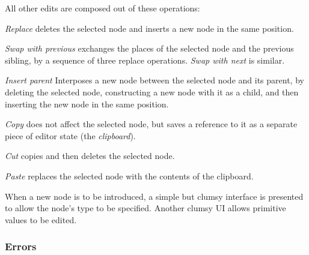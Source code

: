 All other edits are composed out of these operations:

\emph{Replace} deletes the selected node and inserts a new node in the same position.

\emph{Swap with previous} exchanges the places of the selected node and the previous sibling, by a sequence of three replace operations. \emph{Swap with next} is similar.

\emph{Insert parent} Interposes a new node between the selected node and its parent, by deleting the selected node, constructing a new node with it as a child, and then inserting the new node in the same position.



\emph{Copy} does not affect the selected node, but saves a reference to it as a separate piece of editor state (the \emph{clipboard}).

\emph{Cut} copies and then deletes the selected node.

\emph{Paste} replaces the selected node with the contents of the clipboard.

When a new node is to be introduced, a simple but clumsy interface is presented to allow the node's type to be specified. Another clumsy UI allows primitive values to be edited.


\subsubsection{Errors \todo{}}

